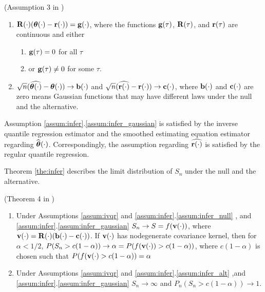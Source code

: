 \begin{assumption}\label{assum:infer} (Assumption 3 in \cite{Chernozhukov2006})
  \begin{enumerate}
    \item $\mathbf{R}(\cdot)(\boldsymbol{\theta}(\cdot) - \mathbf{r}(\cdot)) = \mathbf{g}(\cdot)$, where the
      functions $\mathbf{g}(\tau)$, $\mathbf{R}(\tau)$, and $\mathbf{r}(\tau)$ are continuous and
      either
      \begin{enumerate}
	\item \label{assum:infer_null} $\mathbf{g}(\tau) = 0$ for all $\tau$ 
	\item \label{assum:infer_alt} or $\mathbf{g}(\tau) \neq 0$ for some $\tau$. 
      \end{enumerate}

    \item \label{assum:infer_gaussian}
      $\sqrt{n}(\widehat{\boldsymbol{\theta}(\cdot)} - \boldsymbol{\theta}(\cdot)) \rightarrow
      \mathbf{b}(\cdot)$ and $\sqrt{n}(\widehat{\mathbf{r}(\cdot)} - \mathbf{r}(\cdot)) \rightarrow
      \mathbf{c}(\cdot)$, where $\mathbf{b}(\cdot)$ and $\mathbf{c}(\cdot)$ are zero means Gaussian
      functions that may have different laws under the null and the alternative.
  \end{enumerate}
\end{assumption}

Assumption \ref{assum:infer}.\ref{assum:infer_gaussian} is satisfied by the
inverse quantile regression estimator and the smoothed estimating equation
estimator regarding $\widehat{\boldsymbol{\theta}}(\cdot)$. Correspondingly, the assumption
regarding $\widehat{\mathbf{r}(\cdot)}$ is satisfied by the regular quantile regression.

Theorem \ref{the:infer} describes the limit distribution of $S_n$ under the null
and the alternative.

\begin{theorem}\label{the:infer}(Theorem 4 in \cite{Chernozhukov2006})
  \begin{enumerate}
    \item Under Assumptions \ref{assum:ivqr} and
      \ref{assum:infer}.\ref{assum:infer_null} , and 
      \ref{assum:infer}.\ref{assum:infer_gaussian} 
      $S_n \rightarrow S = f(\mathbf{v}(\cdot))$, where $\mathbf{v}(\cdot) =
      \mathbf{R}(\cdot)(\mathbf{b}(\cdot) - \mathbf{c}(\cdot))$.
      If $\mathbf{v}(\cdot)$ has nodegenerate covariance kernel, then for $\alpha <
      1/2$, $P(S_n > c(1-\alpha)) \rightarrow \alpha = P(f(\mathbf{v}(\cdot)) >
      c(1-\alpha))$, where $c(1-\alpha)$ is chosen such that $P(f(\mathbf{v}(\cdot) >
      c(1-\alpha)) = \alpha$

    \item Under Assumptions \ref{assum:ivqr} and
      \ref{assum:infer}.\ref{assum:infer_alt} ,and 
      \ref{assum:infer}.\ref{assum:infer_gaussian} 
      $S_n \rightarrow \infty$ and $P_n(S_n > c(1 - \alpha)) \rightarrow 1$.

  \end{enumerate}
\end{theorem}

